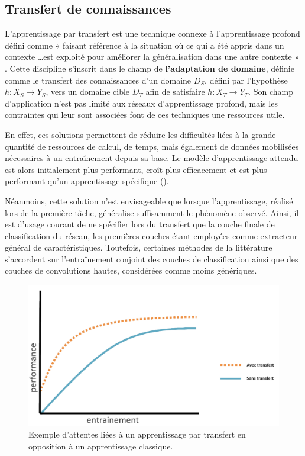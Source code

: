 \clearpage

\subsection{Transfert de connaissances}
\label{sec:transfer_learning}
L’apprentissage par transfert est une technique connexe à l’apprentissage profond défini comme « faisant référence à la situation où ce qui a été appris dans un contexte \ldots est exploité pour améliorer la généralisation dans une autre contexte » \cite{Ngiam2011}. Cette discipline s’inscrit dans le champ de \textbf{l’adaptation de domaine}, définie comme le transfert des connaissances d’un domaine $D_S$, défini par l’hypothèse $h: X_S \rightarrow Y_S$, vers un domaine cible $D_T$ afin de satisfaire $h: X_T \rightarrow Y_T$. Son champ d'application n'est pas limité aux réseaux d'apprentissage profond, mais les contraintes qui leur sont associées font de ces techniques une ressources utile.\par

En effet, ces solutions permettent de réduire les difficultés liées à la grande quantité de ressources de calcul, de temps, mais également de données mobilisées nécessaires à un entraînement depuis sa base. Le modèle d’apprentissage attendu est alors initialement plus performant, croît plus efficacement et est plus performant qu’un apprentissage spécifique ().\par

Néanmoins, cette solution n’est envisageable que lorsque l’apprentissage, réalisé lors de la première tâche, généralise suffisamment le phénomène observé. Ainsi, il est d’usage courant de ne spécifier lors du transfert que la couche finale de classification du réseau, les premières couches étant employées comme extracteur général de caractéristiques. Toutefois, certaines méthodes de la littérature s’accordent sur l'entraînement conjoint des couches de classification ainsi que des couches de convolutions hautes, considérées comme moins génériques.\par

\begin{figure}[H]
    \centering
    \includegraphics[width=\linewidth]{contents/chapter_3/resources/example_learning_curves.pdf}
    \caption{Exemple d'attentes liées à un apprentissage par transfert en opposition à un apprentissage classique.}
    \label{fig:learning_curves}
\end{figure}

